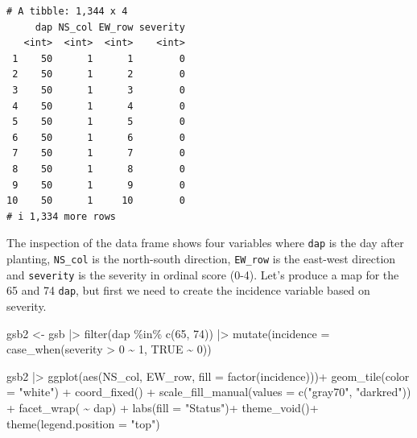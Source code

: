 \documentclass[
  letterpaper,
]{book}
\newenvironment{Shaded}{\begin{snugshade}}{\end{snugshade}}
\newcommand{\AttributeTok}[1]{\textcolor[rgb]{0.40,0.45,0.13}{#1}}
\newcommand{\ConstantTok}[1]{\textcolor[rgb]{0.56,0.35,0.01}{#1}}
\newcommand{\DecValTok}[1]{\textcolor[rgb]{0.68,0.00,0.00}{#1}}
\newcommand{\FunctionTok}[1]{\textcolor[rgb]{0.28,0.35,0.67}{#1}}
\newcommand{\NormalTok}[1]{\textcolor[rgb]{0.00,0.23,0.31}{#1}}
\newcommand{\OtherTok}[1]{\textcolor[rgb]{0.00,0.23,0.31}{#1}}
\newcommand{\SpecialCharTok}[1]{\textcolor[rgb]{0.37,0.37,0.37}{#1}}
\newcommand{\StringTok}[1]{\textcolor[rgb]{0.13,0.47,0.30}{#1}}
\begin{document}
\begin{verbatim}
# A tibble: 1,344 x 4
     dap NS_col EW_row severity
   <int>  <int>  <int>    <int>
 1    50      1      1        0
 2    50      1      2        0
 3    50      1      3        0
 4    50      1      4        0
 5    50      1      5        0
 6    50      1      6        0
 7    50      1      7        0
 8    50      1      8        0
 9    50      1      9        0
10    50      1     10        0
# i 1,334 more rows
\end{verbatim}

The inspection of the data frame shows four variables where \texttt{dap}
is the day after planting, \texttt{NS\_col} is the north-south
direction, \texttt{EW\_row} is the east-west direction and
\texttt{severity} is the severity in ordinal score (0-4). Let's produce
a map for the 65 and 74 \texttt{dap}, but first we need to create the
incidence variable based on severity.

\begin{Shaded}
\begin{Highlighting}[]
\NormalTok{gsb2 }\OtherTok{\textless{}{-}}\NormalTok{ gsb }\SpecialCharTok{|\textgreater{}}
  \FunctionTok{filter}\NormalTok{(dap }\SpecialCharTok{\%in\%} \FunctionTok{c}\NormalTok{(}\DecValTok{65}\NormalTok{, }\DecValTok{74}\NormalTok{)) }\SpecialCharTok{|\textgreater{}} 
  \FunctionTok{mutate}\NormalTok{(}\AttributeTok{incidence =} \FunctionTok{case\_when}\NormalTok{(severity }\SpecialCharTok{\textgreater{}} \DecValTok{0} \SpecialCharTok{\textasciitilde{}} \DecValTok{1}\NormalTok{,}
                               \ConstantTok{TRUE} \SpecialCharTok{\textasciitilde{}} \DecValTok{0}\NormalTok{))}

\NormalTok{gsb2 }\SpecialCharTok{|\textgreater{}} 
  \FunctionTok{ggplot}\NormalTok{(}\FunctionTok{aes}\NormalTok{(NS\_col, EW\_row, }\AttributeTok{fill =} \FunctionTok{factor}\NormalTok{(incidence)))}\SpecialCharTok{+}
  \FunctionTok{geom\_tile}\NormalTok{(}\AttributeTok{color =} \StringTok{"white"}\NormalTok{) }\SpecialCharTok{+}
  \FunctionTok{coord\_fixed}\NormalTok{() }\SpecialCharTok{+}
  \FunctionTok{scale\_fill\_manual}\NormalTok{(}\AttributeTok{values =} \FunctionTok{c}\NormalTok{(}\StringTok{"gray70"}\NormalTok{, }\StringTok{"darkred"}\NormalTok{)) }\SpecialCharTok{+}
  \FunctionTok{facet\_wrap}\NormalTok{( }\SpecialCharTok{\textasciitilde{}}\NormalTok{ dap) }\SpecialCharTok{+}
  \FunctionTok{labs}\NormalTok{(}\AttributeTok{fill =} \StringTok{"Status"}\NormalTok{)}\SpecialCharTok{+}
  \FunctionTok{theme\_void}\NormalTok{()}\SpecialCharTok{+}
  \FunctionTok{theme}\NormalTok{(}\AttributeTok{legend.position =} \StringTok{"top"}\NormalTok{)}
\end{Highlighting}
\end{Shaded}
\end{document}

